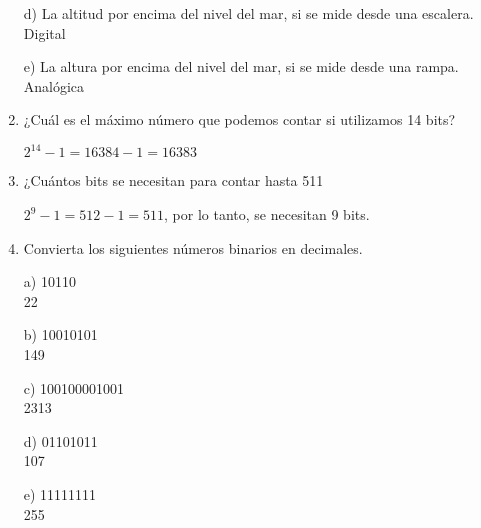 \documentclass[a4paper, 12pt]{article}
\newcommand{\Aspace}{0.2cm}
\begin{document}
\begin{enumerate}
            \vspace{\Aspace} \par
            d) La altitud por encima del nivel del mar, si se mide desde una escalera.
            \\ { \color{azul} Digital }

            \vspace{\Aspace} \par
            e) La altura por encima del nivel del mar, si se mide desde una rampa.
            \\ { \color{azul} Analógica }
       

        \item ¿Cuál es el máximo número que podemos contar si utilizamos 14 bits?
            \vspace{\Aspace} \par
            { \color{azul} $2^{14} - 1 = 16384 - 1 = 16383$ }
 

        \item ¿Cuántos bits se necesitan para contar hasta 511
            \vspace{\Aspace} \par
            { \color{azul} $2^{9} -1 = 512 - 1 = 511$, por lo tanto, se necesitan 9 bits. }
        

        \item Convierta los siguientes números binarios en decimales.
            \vspace{\Aspace} \par
            a) 10110
            \\ { \color{azul} 22 }

            \vspace{\Aspace} \par
            b) 10010101
            \\ { \color{azul} 149 }

            \vspace{\Aspace} \par
            c) 100100001001
            \\ { \color{azul} 2313 }

            \vspace{\Aspace} \par
            d) 01101011
            \\ { \color{azul} 107 }

            \vspace{\Aspace} \par
            e) 11111111
            \\ { \color{azul} 255 }


\end{enumerate}
\end{document}
